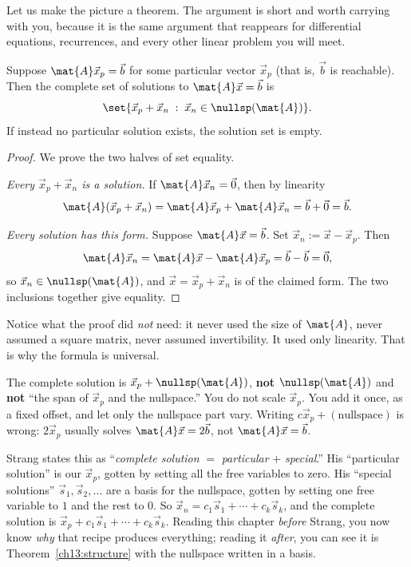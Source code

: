 Let us make the picture a theorem. The argument is short and worth carrying with you,
because it is the same argument that reappears for differential equations, recurrences, and
every other linear problem you will meet.

\begin{theorem}
\label{ch13:structure}
Suppose $\mat{A}\vec{x}_p=\vec{b}$ for some particular vector $\vec{x}_p$ (that is,
$\vec{b}$ is reachable). Then the complete set of solutions to $\mat{A}\vec{x}=\vec{b}$ is
\[
  \set{\vec{x}_p+\vec{x}_n \;:\; \vec{x}_n\in\nullsp(\mat{A})}.
\]
If instead no particular solution exists, the solution set is empty.
\end{theorem}

\begin{proof}
We prove the two halves of set equality.

\emph{Every $\vec{x}_p+\vec{x}_n$ is a solution.} If $\mat{A}\vec{x}_n=\vec{0}$, then by
linearity
\[
  \mat{A}(\vec{x}_p+\vec{x}_n)=\mat{A}\vec{x}_p+\mat{A}\vec{x}_n=\vec{b}+\vec{0}=\vec{b}.
\]

\emph{Every solution has this form.} Suppose $\mat{A}\vec{x}=\vec{b}$. Set
$\vec{x}_n:=\vec{x}-\vec{x}_p$. Then
\[
  \mat{A}\vec{x}_n=\mat{A}\vec{x}-\mat{A}\vec{x}_p=\vec{b}-\vec{b}=\vec{0},
\]
so $\vec{x}_n\in\nullsp(\mat{A})$, and $\vec{x}=\vec{x}_p+\vec{x}_n$ is of the claimed
form. The two inclusions together give equality.
\end{proof}

Notice what the proof did \emph{not} need: it never used the size of $\mat{A}$, never
assumed a square matrix, never assumed invertibility. It used only linearity. That is why
the formula is universal.

\begin{trapbox}
The complete solution is $\vec{x}_p+\nullsp(\mat{A})$, \textbf{not} $\nullsp(\mat{A})$ and
\textbf{not} ``the span of $\vec{x}_p$ and the nullspace.'' You do not scale $\vec{x}_p$.
You add it once, as a fixed offset, and let only the nullspace part vary. Writing
$c\vec{x}_p+(\text{nullspace})$ is wrong: $2\vec{x}_p$ usually solves
$\mat{A}\vec{x}=2\vec{b}$, not $\mat{A}\vec{x}=\vec{b}$.
\end{trapbox}

\begin{strangbox}
Strang states this as ``\emph{complete solution} $=$ \emph{particular} $+$
\emph{special}.'' His ``particular solution'' is our $\vec{x}_p$, gotten by setting all the
free variables to zero. His ``special solutions'' $\vec{s}_1,\vec{s}_2,\dots$ are a basis
for the nullspace, gotten by setting one free variable to $1$ and the rest to $0$. So
$\vec{x}_n=c_1\vec{s}_1+\cdots+c_k\vec{s}_k$, and the complete solution is
$\vec{x}_p+c_1\vec{s}_1+\cdots+c_k\vec{s}_k$. Reading this chapter \emph{before} Strang,
you now know \emph{why} that recipe produces everything; reading it \emph{after}, you can
see it is Theorem~\ref{ch13:structure} with the nullspace written in a basis.
\end{strangbox}

